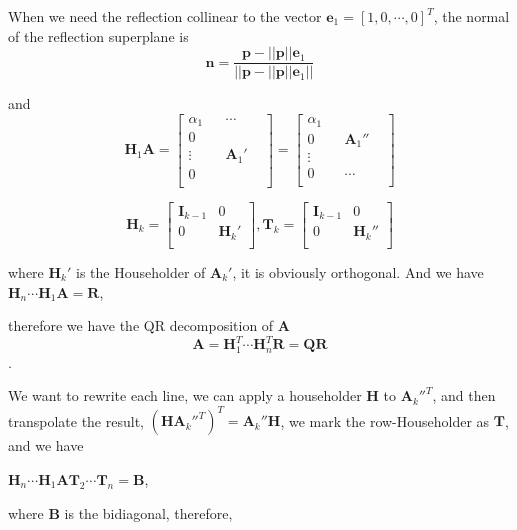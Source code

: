 \documentclass[UTF8]{../../09-Mathematics}
\begin{document}
When we need the reflection collinear to the vector $\boldsymbol e_1 = [1,0,\cdots,0]^T$, the normal of the reflection superplane is 
$$
\boldsymbol n = \frac{\boldsymbol p - ||\boldsymbol p || \boldsymbol e_1}{||\boldsymbol p - ||\boldsymbol p || \boldsymbol e_1||}
$$

and 
$$
\boldsymbol H_1 \boldsymbol A = 
\begin{bmatrix}
\alpha _1& & \cdots &\\
0& &  &\\
\vdots& & \boldsymbol A_1' &\\
0& &  &\\
\end{bmatrix}
= 
\begin{bmatrix}
\alpha _1& & &\\
0& &  \boldsymbol A_1''&\\
\vdots& &  &\\
0& &   \cdots&\\
\end{bmatrix}
$$

$$
\boldsymbol H_k  = 
\begin{bmatrix}
\boldsymbol I_{k-1}& 0\\
0& \boldsymbol H_{k}'\\
\end{bmatrix},
\boldsymbol T_k  = 
\begin{bmatrix}
\boldsymbol I_{k-1}& 0\\
0& \boldsymbol H_{k}''\\
\end{bmatrix}
$$

where $\boldsymbol H_{k}'$ is the Householder of $\boldsymbol A_{k}'$, it is obviously orthogonal. And we have
$\boldsymbol H_n \cdots \boldsymbol H_{1} \boldsymbol A= \boldsymbol R$, 

therefore we have the QR decomposition of $\boldsymbol A$
$$
\boldsymbol A= \boldsymbol H_{1}^T \cdots \boldsymbol H_{n}^T  \boldsymbol R =  \boldsymbol Q  \boldsymbol R 
$$.

We want to rewrite each line, we can apply a householder $ \boldsymbol H$ to $ \boldsymbol A_k''^T$, and then transpolate the result, $(\boldsymbol H \boldsymbol A_k''^T)^T =\boldsymbol A_k''\boldsymbol H $, we mark the row-Householder as $ \boldsymbol T$, and we have

$\boldsymbol H_n \cdots \boldsymbol H_1 \boldsymbol A \boldsymbol T_2 \cdots \boldsymbol T_n= \boldsymbol B$,

where $\boldsymbol B$ is the bidiagonal, therefore,
\end{document}
